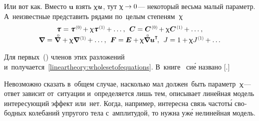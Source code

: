 \begin{otherlanguage}{russian}
Или вот как. Вместо $\bm{u}$ взять $\upchi \bm{u}$, тут ${\upchi \hspace{-0.1ex}\to 0}$\:--- некоторый весьма малый параметр. А~неизвестные представить рядами по~целым степеням~$\upchi$
\vspace{.1em}\[\begin{array}{c}
\mathboldtau \hspace{.1ex} = \mathboldtau^{\hspace{0.2ex}\scalebox{0.66}[0.66]{(0)}} \hspace{-0.2ex} + \smallparameter \mathboldtau^{\hspace{0.2ex}\scalebox{0.66}[0.66]{(1)}} \hspace{-0.1ex} + \ldots \hspace{0.1ex}, \:\:
\bm{C} = \bm{C}^{\hspace{0.2ex}\scalebox{0.66}[0.66]{(0)}} \hspace{-0.2ex} + \smallparameter \bm{C}^{\hspace{0.2ex}\scalebox{0.66}[0.66]{(1)}} \hspace{-0.1ex} + \ldots \hspace{0.1ex}, \\[0.1em]
\boldnabla \hspace{0.1ex} = \boldnablacircled \hspace{0.1ex} + \smallparameter \boldnabla^{\hspace{0.2ex}\scalebox{0.66}[0.66]{(1)}} \hspace{-0.1ex} + \ldots \hspace{0.1ex} , \:\:
\bm{F} = \bm{E} + \hspace{-0.1ex} \smallparameter \boldnablacircled {\bm{u}}^{\T} \hspace{-0.3ex}, \:\:
J = 1 + \hspace{-0.1ex} \smallparameter J^{\hspace{0.1ex}\scalebox{0.66}[0.66]{(1)}} \hspace{-0.1ex} + \ldots
\end{array}\]

\noindent Для первых~() членов этих разложений и~получается~\eqref{lineartheory:wholesetofequations}. В~\hbox{книге~\cite{truesdell-firstcourse}} си\'{е} названо [.]

Невозможно сказать в~общем случае, насколько мал должен~быть параметр~$\upchi$\:--- ответ зависит от~ситуации и~определяется лишь тем, описывает линейная модель интересующий эффект или~нет. Когда, например, интересна связь частот\'{ы} свободных колебаний упругого тела с~амплитудой, то нужна уж\'{е} нелинейная модель.


\end{otherlanguage}
